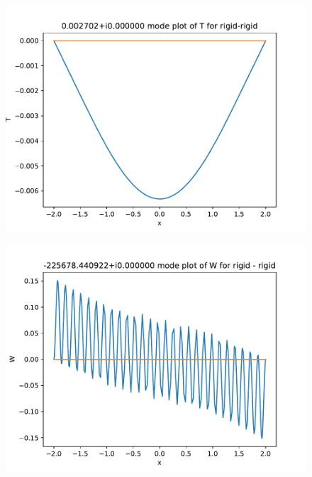 \documentclass[12pt,a4paper,oneside]{article}
\begin{document}
  \newpage
        \begin{figure}[h!]
          \centering
          \includegraphics{./rigid-rigid_T_plot.pdf}
        \end{figure}

        \begin{figure}[h!]
          \centering
          \includegraphics{./rigid-rigid_W_plot.pdf}
        \end{figure}
\end{document}
